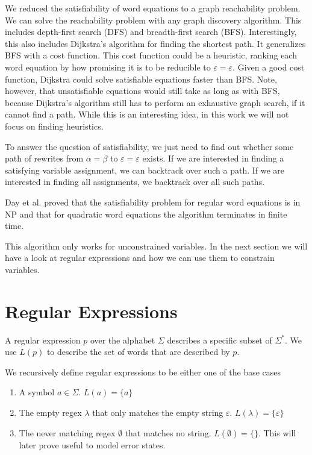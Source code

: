 We reduced the satisfiability of word equations to a graph reachability problem. We can solve the reachability problem with any graph discovery algorithm. This includes depth-first search (DFS) and breadth-first search (BFS).
Interestingly, this also includes Dijkstra's \cite{dijkstra} algorithm for finding the shortest path. It generalizes BFS with a cost function. This cost function could be a heuristic, ranking each word equation by how promising it is to be reducible to $\varepsilon = \varepsilon$. Given a good cost function, Dijkstra could solve satisfiable equations faster than BFS. Note, however, that unsatisfiable equations would still take as long as with BFS, because Dijkstra's algorithm still has to perform an exhaustive graph search, if it cannot find a path. While this is an interesting idea, in this work we will not focus on finding heuristics.

To answer the question of satisfiability, we just need to find out whether some path of rewrites from $\alpha = \beta$ to $\varepsilon = \varepsilon$ exists. If we are interested in finding a satisfying variable assignment, we can backtrack over such a path. If we are interested in finding all assignments, we backtrack over all such paths.

Day et al. \cite{manea-nielsen} proved that the satisfiability problem for regular word equations is in NP and that for quadratic word equations the algorithm terminates in finite time.

This algorithm only works for unconstrained variables. In the next section we will have a look at regular expressions and how we can use them to constrain variables.

\section{Regular Expressions}
A regular expression $p$ over the alphabet $\Sigma$ describes a specific subset of $\Sigma^*$.
We use $L(p)$ to describe the set of words that are described by $p$. \cite{brzozowski}

We recursively define regular expressions to be either one of the base cases
\begin{enumerate}
    \item A symbol $a \in \Sigma$. $L(a) = \{a\}$
    \item The empty regex $\lambda$ that only matches the empty string $\varepsilon$. $L(\lambda) =            \{\varepsilon\}$
    \item The never matching regex $\emptyset$ that matches no string. $L(\emptyset) = \{\}$. This will later prove useful to model error states.
\end{enumerate}

